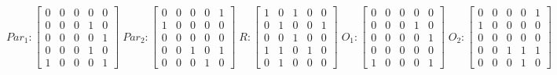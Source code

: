      $$
        Par_{1} : \begin{bmatrix}
            0 & 0 & 0 & 0 & 0 \\
            0 & 0 & 0 & 1 & 0 \\
            0 & 0 & 0 & 0 & 1 \\
			0 & 0 & 0 & 1 & 0 \\
            1 & 0 & 0 & 0 & 1 
        \end{bmatrix}
        \;
        Par_{2} : \begin{bmatrix}
            0 & 0 & 0 & 0 & 1 \\
            1 & 0 & 0 & 0 & 0 \\
            0 & 0 & 0 & 0 & 0 \\
            0 & 0 & 1 & 0 & 1 \\
            0 & 0 & 0 & 1 & 0
        \end{bmatrix}
        \;
        R : \begin{bmatrix}
            1 & 0 & 1 & 0 & 0 \\
            0 & 1 & 0 & 0 & 1 \\
            0 & 0 & 1 & 0 & 0 \\
            1 & 1 & 0 & 1 & 0 \\
            0 & 1 & 0 & 0 & 0
        \end{bmatrix}
        \;
        O_{1} : \begin{bmatrix}
            0 & 0 & 0 & 0 & 0 \\
            0 & 0 & 0 & 1 & 0 \\
            0 & 0 & 0 & 0 & 1 \\
            0 & 0 & 0 & 0 & 0 \\
            1 & 0 & 0 & 0 & 1
        \end{bmatrix}
        \;
        O_{2} : \begin{bmatrix}
            0 & 0 & 0 & 0 & 1 \\
            1 & 0 & 0 & 0 & 0 \\
            0 & 0 & 0 & 0 & 0 \\
            0 & 0 & 1 & 1 & 1 \\
            0 & 0 & 0 & 1 & 0
        \end{bmatrix}
    $$ 
